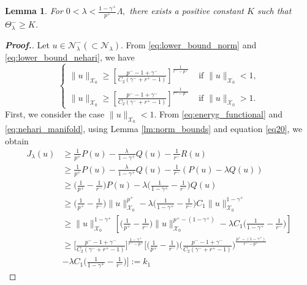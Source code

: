 \documentclass[11pt]{article}
\newtheorem{lemma}{Lemma}[section] %
\newcommand{\X}{\mathcal{X}_{0}}
\newcommand{\Th} {\Theta}
\newcommand{\ga} {\gamma}
\newcommand{\la} {\lambda}
\newcommand{\La} {\Lambda}
\newcommand{\lsb}{\left[}
\newcommand{\rsb}{\right]}
\begin{document}
\begin{lemma}\label{lm:Nehari_negative}
For $0<\la<\frac{1-\ga^+}{p^+}\La,$
there exists a positive constant $K$
such that $\Th_\la^-\ge K$.
\end{lemma}


\begin{proof}[\bf Proof.]
Let 
$u\in \mathcal{N}_\la^-(\subset\mathcal{N}_\la).$
From \eqref{eq:lower_bound_norm} and 
\eqref{eq:lower_bound_nehari}, we have
        \begin{equation}\label{eq20}
            \begin{cases}
            \|u\|_{\X} \geq 
 \left[
\frac{p^- - 1 + \gamma^-}{C_2(\gamma^- + r^+ - 1)}\right]^
\frac{1}{{r^- - p^+}} &\text{ if }\|u\|_{\X}< 1,\\[5pt]
\|u\|_{\X} \geq \left[
\frac{p^- - 1 + \gamma^-}{C_2(\gamma^- + r^+ - 1)}\right]^
\frac{1}{{r^+ - p^-}} &\text{ if }\|u\|_{\X}> 1.
            \end{cases}
        \end{equation}
        First, we consider the case $\|u\|_{\X}<1.$
From \eqref{eq:eneryg_functional} and 
\eqref{eq:nehari_manifold}, using Lemma 
\ref{lm:norm_bounds} and equation 
\eqref{eq20}, we obtain
        \begin{align*}
        J_\la(u) & \ge 
\frac{1}{p^+}P(u)-
\frac{\la}{1-\ga^+}Q(u)-
\frac{1}{r^-}R(u)\\
         & \ge 
\frac{1}{p^+}P(u)-
\frac{\la}{1-\ga^+}Q(u)-
\frac{1}{r^-}(P(u)-\la Q(u))\\
         & \ge  
\Big (
\frac{1}{p^+}-
\frac{1}{r^-} 
\Big ) P(u)-\la   
\Big (
\frac{1}{1-\ga^+}-
\frac{1}{r^-}  
\Big ) Q(u)\\
         & \ge    
\Big (
\frac{1}{p^+}-
\frac{1}{r^-}  
\Big ) \|u\|_{\X}^{p^+}-\la   
\Big (
\frac{1}{1-\ga^+}-
\frac{1}{r^-}  
\Big ) C_1\|u\|_{\X}^{1-\ga^+}\\
         & \ge \|u\|_{\X}^{1-\ga^+}\lsb  
\Big (
\frac{1}{p^+}-
\frac{1}{r^-}  
\Big ) \|u\|_{\X}^{p^+-(1-\ga^+)}-\la C_1   
\Big (
\frac{1}{1-\ga^+}-
\frac{1}{r^-}  
\Big )\rsb\\
         & \ge
\Big [
\frac{p^- - 1 + \gamma^-}{C_2(\gamma^- + r^+ - 1)}
\Big ]^
\frac{1-\ga^+}{{r^- - p^+}}
\Big [  
\Big (
\frac{1}{p^+}-
\frac{1}{r^-}  
\Big ) 
\Big  (
\frac{p^- - 1 + \gamma^-}{C_2(\gamma^- + r^+ - 1)}
\Big  )^
\frac{p^+-(1-\ga^+)}{{r^- - p^+}}  \\
        &
        -\la C_1   
\Big (
\frac{1}{1-\ga^+}-
\frac{1}{r^-}  
\Big )\Big ]:=k_1
    \end{align*}

\end{proof}
\end{document}
